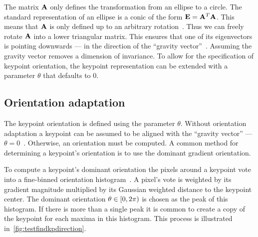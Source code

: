         The matrix $\mathbf{A}$ only defines the transformation from an
          ellipse to a circle.
        The standard representation of an ellipse is a conic of the
          form $\mathbf{E} = \mathbf{A}^T\mathbf{A}$.
        This means that $\mathbf{A}$ is only defined up to an arbitrary
          rotation~\cite{mikolajczyk_comparison_2005,perdoch_efficient_2009}.
        Thus we can freely rotate $\mathbf{A}$ into a lower triangular
          matrix.
        This ensures that one of its eigenvectors is pointing downwards
          --- \ie{} in the direction of the ``gravity
          vector''~\cite{perdoch_efficient_2009}.
        Assuming the gravity vector removes a dimension of invariance.
        To allow for the specification of keypoint orientation, the
          keypoint representation can be extended with a parameter
          $\theta$ that defaults to $0$.

    \subsection{Orientation adaptation}

        The keypoint orientation is defined using the parameter
          $\theta$.
        Without orientation adaptation a keypoint can be assumed to be
          aligned with the ``gravity vector'' --- \ie{}
          $\theta=0$~\cite{perdoch_efficient_2009}.
        Otherwise, an orientation must be computed.
        A common method for determining a keypoint's orientation is to
          use the dominant gradient orientation.

        To compute a keypoint's dominant orientation the pixels around
          a keypoint vote into a fine-binned orientation
          histogram~\cite{lowe_distinctive_2004}.
        A pixel's vote is weighted by its gradient magnitude multiplied
          by its Gaussian weighted distance to the keypoint center.
        The dominant orientation $\theta \in [0,2\pi\rparen$ is
          chosen as the peak of this histogram.
        If there is more than a single peak it is common to create a
          copy of the keypoint for each maxima in this histogram.
        This process is illustrated in~\cref{fig:testfindkpdirection}.

        \testfindkpdirection{}


